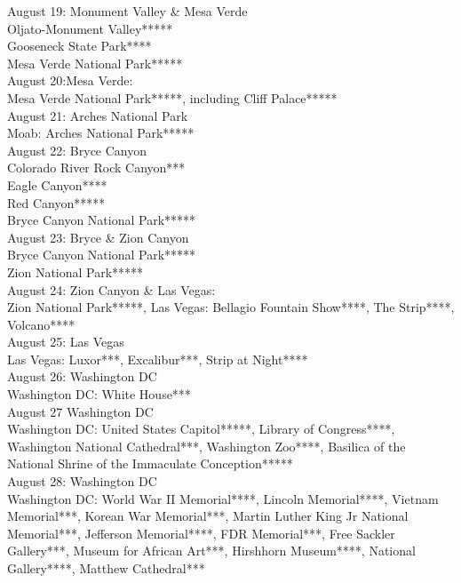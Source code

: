 August 19: Monument Valley \& Mesa Verde\\
Oljato-Monument Valley*****\\
Gooseneck State Park****\\
Mesa Verde National Park*****\\

August 20:Mesa Verde: \\
Mesa Verde National Park*****, including Cliff Palace*****\\

August 21: Arches National Park\\
Moab: Arches National Park*****\\

August 22: Bryce Canyon\\
Colorado River Rock Canyon***\\
Eagle Canyon****\\
Red Canyon*****\\
Bryce Canyon National Park*****\\

August 23: Bryce \& Zion Canyon\\
Bryce Canyon National Park*****\\
 Zion National Park*****\\

August 24: Zion Canyon \& Las Vegas:\\
Zion National Park*****, 
Las Vegas: Bellagio Fountain Show****, The Strip****, Volcano****\\

August 25: Las Vegas\\
Las Vegas: Luxor***, Excalibur***, Strip at Night****\\

August 26: Washington DC\\
Washington DC: White House***\\

August 27 Washington DC\\
Washington DC: United States Capitol*****,  Library of Congress****, Washington National Cathedral***, Washington Zoo****, Basilica of the National Shrine of the Immaculate Conception*****\\

August 28: Washington DC\\
Washington DC: World War II Memorial****, Lincoln Memorial****, Vietnam Memorial***, Korean War Memorial***, Martin Luther King Jr National Memorial***, Jefferson Memorial****, FDR Memorial***, Free Sackler Gallery***, Museum for African Art***, Hirshhorn Museum****, National Gallery****, Matthew Cathedral***\\

